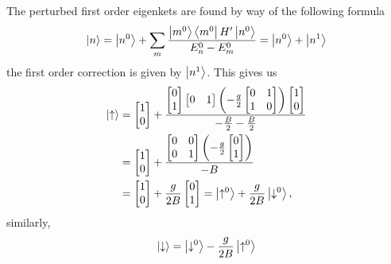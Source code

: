 \documentclass[11pt]{amsart}
\begin{document}
The perturbed first order eigenkets are found by way of the following formula
\begin{equation}
\ket{n} = \ket{n^0}+  \sum_{m} \frac{\ket{m^0}\bra{m^0}H'\ket{n^0}}{E_n^0-E_m^0} = \ket{n^0} + \ket{n^1}
\end{equation} 
the first order correction is given by $\ket{n^1}$. This gives us
\begin{align*}
\ket{\uparrow} &= 
\begin{bmatrix}
1 \\ 0
\end{bmatrix}
+
\frac{ 
\begin{bmatrix}
0 \\ 1
\end{bmatrix}
\begin{bmatrix}
0 & 1
\end{bmatrix}
\left(-\frac{g}{2}\begin{bmatrix}
0 & 1 \\
1 & 0
\end{bmatrix}\right)
\begin{bmatrix}
1 \\ 0
\end{bmatrix}
}{-\frac{B}{2}-\frac{B}{2}}
\\&= 
\begin{bmatrix}
1 \\ 0
\end{bmatrix}
+
\frac{ 
\begin{bmatrix}
0 & 0 \\
0 & 1
\end{bmatrix}
\left(-\frac{g}{2}\begin{bmatrix}
0 \\ 1
\end{bmatrix}\right)
}{-B}
\\&=
\begin{bmatrix}
1 \\ 0
\end{bmatrix}
+ 
\frac{g}{2B}
\begin{bmatrix}
0 \\ 1
\end{bmatrix}
= \ket{\uparrow^0} + \frac{g}{2B}\ket{\downarrow^0},
\end{align*}
similarly,
\begin{equation*}
\ket{\downarrow} = \ket{\downarrow^0} - \frac{g}{2B}\ket{\uparrow^0}
\end{equation*}
\end{document}
